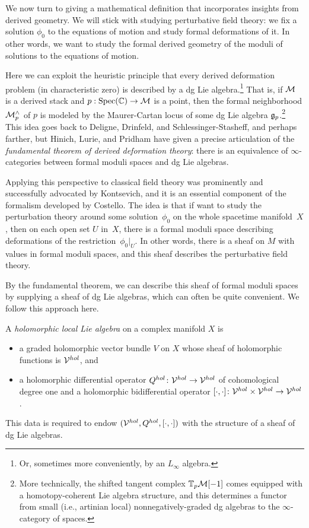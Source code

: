 \documentclass[11pt]{amsart}
\def\Spec{\text{Spec}}
\begin{document}
We now turn to giving a mathematical definition that incorporates insights from derived geometry.
We will stick with studying perturbative field theory: 
we fix a solution $\phi_0$ to the equations of motion and study formal deformations of it.
In other words, we want to study the formal derived geometry of the moduli of solutions to the equations of motion.

Here we can exploit the heuristic principle that every derived deformation problem (in characteristic zero) is described by a dg Lie algebra.\footnote{Or, sometimes more conveniently, by an $L_\infty$ algebra.}
That is, if $\mathcal M$ is a derived stack and $p: \Spec(\CC) \to \cM$ is a point, 
then the formal neighborhood $\mathcal M^\wedge_p$ of $p$ is modeled by the Maurer-Cartan locus of some dg Lie algebra $\mathfrak g_p$.\footnote{More technically, the shifted tangent complex $\mathbb T_p \mathcal M[-1]$ comes equipped with a homotopy-coherent Lie algebra structure, 
and this determines a functor from small (i.e., artinian local) nonnegatively-graded dg algebras to the $\infty$-category of spaces.}
This idea goes back to Deligne, Drinfeld, and Schlessinger-Stasheff, and perhaps farther, 
but Hinich, Lurie, and Pridham have given a precise articulation of the {\em fundamental theorem of derived deformation theory}:
there is an equivalence of $\infty$-categories between formal moduli spaces and dg Lie algebras.

Applying this perspective to classical field theory was prominently and successfully advocated by Kontsevich, 
and it is an essential component of the formalism developed by Costello.
The idea is that if want to study the perturbation theory around some solution~$\phi_0$ on the whole spacetime manifold~$X$,
then on each open set $U$ in~$X$,
there is a formal moduli space describing deformations of the restriction~$\phi_0|_U$.
In other words, there is a sheaf on $M$ with values in formal moduli spaces,
and this sheaf describes the perturbative field theory.

By the fundamental theorem, we can describe this sheaf of formal moduli spaces by supplying a sheaf of dg Lie algebras, which can often be quite convenient.
We follow this approach here.

\begin{dfn} 
A {\em holomorphic local Lie algebra} on a complex manifold $X$ is
\begin{itemize}
\item a graded holomorphic vector bundle $V$ on $X$ whose sheaf of holomorphic functions is $\mathcal V^{hol}$, and
\item a holomorphic differential operator $Q^{hol} \colon \mathcal V^{hol} \to \mathcal V^{hol}$ of cohomological degree one and a holomorphic bidifferential operator $[\cdot,\cdot] \colon \mathcal V^{hol} \times \mathcal V^{hol} \to \mathcal V^{hol}$. 
\end{itemize}
This data is required to endow $(\mathcal V^{hol}, Q^{hol}, [\cdot,\cdot])$ with the structure of a sheaf of dg Lie algebras.
\end{dfn}
\end{document}
